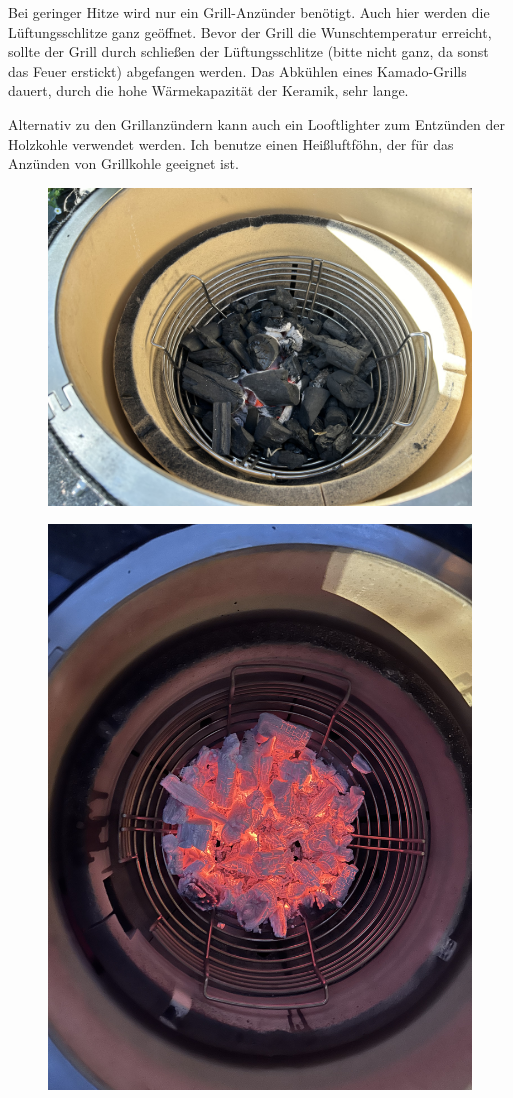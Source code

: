 	Bei geringer Hitze wird nur ein Grill-Anzünder benötigt. Auch hier werden die 
	Lüftungsschlitze ganz 
	geöffnet. Bevor der Grill die Wunschtemperatur erreicht, sollte der Grill durch 
	schließen der 
	Lüftungsschlitze (bitte nicht ganz, da sonst das Feuer erstickt) abgefangen 
	werden. Das Abkühlen eines 
	Kamado-Grills dauert, durch die hohe Wärmekapazität der Keramik, sehr lange.
	
	Alternativ zu den Grillanzündern kann auch ein Looftlighter zum Entzünden der 
	Holzkohle verwendet 
	werden. Ich benutze einen Heißluftföhn, der für das Anzünden von Grillkohle 
	geeignet ist.

\begin{figure}[htbp]
	\centering
	\begin{minipage}{.5\textwidth}
		\centering
		\includegraphics[width=.5\linewidth]{pics/Anfeuern_Monolith}
		\label{fig:Anfeuern}
	\end{minipage}%
	\begin{minipage}{.5\textwidth}
		\centering
		\includegraphics[width=.5\linewidth]{pics/Große_Hitze}
		\label{fig:Große}
	\end{minipage}%
\end{figure}
\newpage

